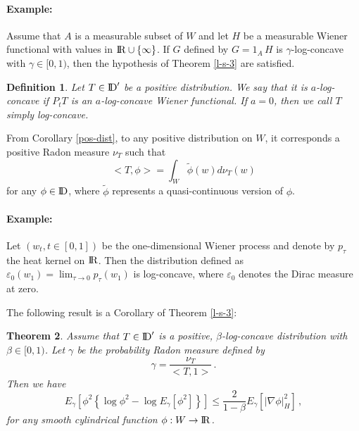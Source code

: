 \documentclass[12pt,a4paper]{book}
\newtheorem{theorem}{Theorem}[section]
\newtheorem{definition}[theorem]{Definition}
\newcommand{\veps}{\varepsilon}
\newcommand{\reals}{{\rm I\!R}}
\newcommand{\DD}{{\rm I\!D}}
\newcommand{\remark}{\noindent {\bf Remark:\ }}
\begin{document}
\paragraph{Example:}
Assume that $A$ is a measurable subset of $W$ and let $H$ be a
measurable Wiener functional with values in
$\reals\cup\{\infty\}$. If $G$ defined by  $G=1_A\,H$ is
$\gamma$-log-concave with $\gamma\in [0,1)$, then the hypothesis of Theorem
\ref{l-s-3} are satisfied.

\begin{definition}
Let $T\in \DD'$ be a positive distribution. We say that it is
$a$-log-concave if $P_tT$ is an $a$-log-concave Wiener functional. If
$a=0$, then we call $T$ simply log-concave.
\end{definition}
\remark
From Corollary \ref{pos-dist},  to any positive
distribution on $W$, it
corresponds a positive Radon measure $\nu_T$ such that
$$
<T,\phi>=\int_W {\tilde{\phi}}(w)d\nu_T(w)
$$
 for any $\phi\in \DD$, where $\tilde{\phi}$ represents a
 quasi-continuous version of $\phi$.
\paragraph{Example:}
Let $(w_t,t\in [0,1])$ be the one-dimensional Wiener process and
denote by  $p_\tau$ the heat kernel on $\reals$.  Then the
distribution defined as $\veps_0(w_1)=\lim_{\tau\to 0}p_\tau(w_1)$ is
log-concave, where $\veps_0$ denotes the Dirac measure at zero.

The following result is a Corollary of Theorem \ref{l-s-3}:

\begin{theorem}
\label{dist-case}
Assume that $T\in \DD'$ is a positive, $\beta$-log-concave distribution
with $\beta\in [0,1)$. Let $\gamma$ be the probability  Radon  measure
defined by
$$
\gamma=\frac{\nu_T}{<T,1>}\,.
$$
Then we have
\begin{equation}
\label{l-s-4}
E_\gamma\left[\phi^2\left\{\log \phi^2-\log E_\gamma[\phi^2]\right\}\right]\leq
\frac{2}{1-\beta}E_\gamma[|\nabla \phi|_H^2]\,,
\end{equation}
for any smooth cylindrical function $\phi:W\to \reals$.
\end{theorem}
\end{document}
